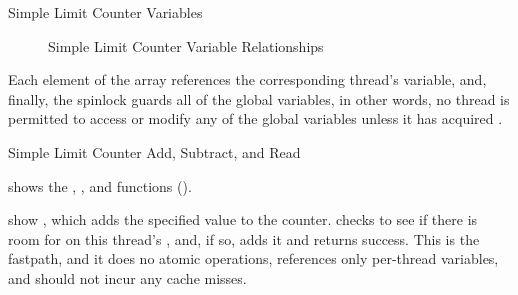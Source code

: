 \begin{listing}

\caption{Simple Limit Counter Variables}
\label{lst:count:Simple Limit Counter Variables}
\end{listing}

\begin{figure}
\centering
{}
\caption{Simple Limit Counter Variable Relationships}
\label{fig:count:Simple Limit Counter Variable Relationships}
\end{figure}

Each element of the  array references the corresponding
thread's  variable, and, finally, the 
spinlock guards all of the global variables, in other words, no thread
is permitted to access or modify any of the global variables unless it
has acquired .

\begin{listing}

\caption{Simple Limit Counter Add, Subtract, and Read}
\label{lst:count:Simple Limit Counter Add; Subtract; and Read}
\end{listing}

shows the , , and 
functions ().

\QuickQuizEnd

\begin{fcvref}
 show ,
which adds the specified value 
to the counter.
 checks to see if there is room for
 on this thread's
, and, if so,
 adds it and  returns success.
This is the  fastpath, and it does no atomic operations,
references only per-thread variables, and should not incur any cache misses.
\end{fcvref}

